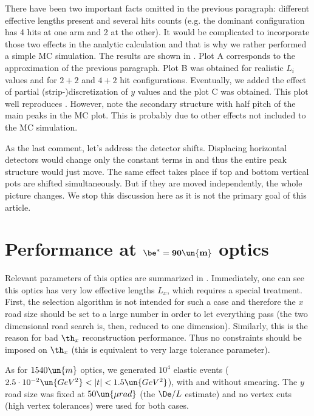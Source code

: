 There have been two important facts omitted in the previous paragraph: different effective lengths present and several hits counts (e.g. the dominant configuration has 4 hits at one arm and 2 at the other). It would be complicated to incorporate those two effects in the analytic calculation and that is why we rather performed a simple MC simulation. The results are shown in . Plot A corresponds to the approximation of the previous paragraph. Plot B was obtained for realistic $L_i$ values and for $2+2$ and $4+2$ hit configurations. Eventually, we added the effect of partial (strip-)discretization of $y$ values and the plot C was obtained. This plot well reproduces . However, note the secondary structure with half pitch of the main peaks in the MC plot. This is probably due to other effects not included to the MC simulation.

As the last comment, let's address the detector shifts. Displacing horizontal detectors would change only the constant terms in  and thus the entire peak structure would just move. The same effect takes place if top and bottom vertical pots are shifted simultaneously. But if they are moved independently, the whole picture changes. We stop this discussion here as it is not the primary goal of this article.






\section[90]{Performance at $\mathbf{\be^* = 90\un{m}}$ optics}

Relevant parameters of this optics are summarized in . Immediately, one can see this optics has very low effective lengths $L_x$, which requires a special treatment. First, the selection algorithm is not intended for such a case and therefore the $x$ road size should be set to a large number in order to let everything pass (the two dimensional road search is, then, reduced to one dimension). Similarly, this is the reason for bad $\th_x$ reconstruction performance. Thus no constraints should be imposed on $\th_x$ (this is equivalent to very large tolerance parameter).

As for $1540\un{m}$ optics, we generated $10^4$ elastic events ($2.5\cdot10^{-2}\un{GeV^2} < |t| < 1.5\un{GeV^2}$), with and without smearing. The $y$ road size was fixed at $50\un{\mu rad}$ (the $\De/L$ estimate) and no vertex cuts (high vertex tolerances) were used for both cases.

